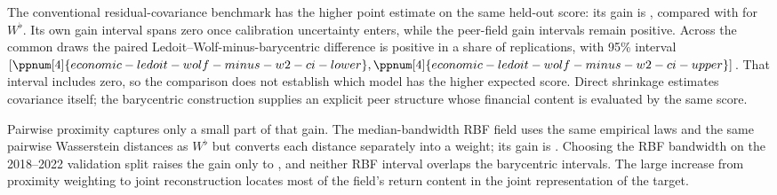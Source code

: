 

The conventional residual-covariance benchmark has the higher point estimate
on the same held-out score: its gain is
, compared with
 for $W^\flat$.
Its own gain interval spans zero once calibration uncertainty enters, while
the peer-field gain intervals remain positive.
Across the common draws the paired Ledoit--Wolf-minus-barycentric
difference is positive
in a share  of
replications, with 95\% interval
$[\ppnum[4]{economic-ledoit-wolf-minus-w2-ci-lower},
\ppnum[4]{economic-ledoit-wolf-minus-w2-ci-upper}]$.
That interval includes zero, so the comparison does not establish which model
has the higher expected score.
Direct shrinkage estimates covariance itself; the barycentric construction
supplies an explicit peer structure whose financial content is evaluated by
the same score.

Pairwise proximity captures only a small part of that gain.
The median-bandwidth RBF field uses the same empirical laws and the same
pairwise Wasserstein distances as $W^\flat$ but converts each
distance separately
into a weight; its gain is .
Choosing the RBF bandwidth on the 2018--2022 validation split raises the gain
only to , and neither RBF interval
overlaps the barycentric intervals.
The large increase from proximity weighting to joint reconstruction locates
most of the field's return content in the joint representation of the target.

